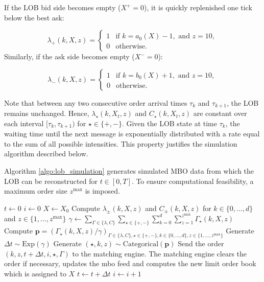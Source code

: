 \documentclass[10pt,a4paper,oneside]{article}
\begin{document}
If the LOB bid side becomes empty ($X^+ = 0$), it is quickly replenished one tick below the best ask:

\[
    \lambda_+(k, X, z) =
    \begin{cases}
        1 & \text{if } k = a_0(X) - 1, \text{ and } z = 10, \\
        0 & \text{otherwise.}
    \end{cases}
\]
Similarly, if the ask side becomes empty ($X^- = 0$):

\[
    \lambda_-(k, X, z) =
    \begin{cases}
        1 & \text{if } k = b_0(X) + 1, \text{ and } z = 10, \\
        0 & \text{otherwise.}
    \end{cases}
\]

Note that between any two consecutive order arrival times $\tau_k$ and $\tau_{k+1}$, the LOB remains unchanged. Hence, $\lambda_{\star}(k, X_t, z)$ and $C_{\star}(k, X_t, z)$ are constant over each interval $[\tau_k, \tau_{k+1})$ for $\star \in \{+, -\}$. Given the LOB state at time $\tau_k$, the waiting time until the next message is exponentially distributed with a rate equal to the sum of all possible intensities. This property justifies the simulation algorithm described below.

Algorithm \ref{algo:lob_simulation} generates simulated MBO data from which the LOB can be reconstructed for $t \in [0,T]$. To ensure computational feasibility, a maximum order size $z^{\max}$ is imposed.


\begin{algorithm}[H]
    \caption{Limit Order Book Simulation Algorithm}
    \label{algo:lob_simulation}
    \begin{algorithmic}
        \State $t \gets 0$
        \State $i \gets 0$
        \State $X \gets X_0$
        \State Compute $\lambda_{\pm}(k, X, z)$ and $C_{\pm}(k, X, z)$ for $k \in \{0 , \dots, d \}$ and $z \in \{ 1, \dots, z^{\max} \}$
        \State $\gamma \gets \sum_{\Gamma \in \{ \lambda, C \}} \sum_{\star \in \{+, - \}} \sum^{d}_{k = 0} \sum^{z^{\max}}_{z = 1} \Gamma_{\star}(k, X, z)$
        \State Compute $\mathbf{p} = \left(\Gamma_{\star}(k, X, z) / \gamma\right)_{\Gamma \in \{ \lambda, C \}, \star \in \{+, -\}, k \in \{ 0, \dots, d \}, z \in \{1, \dots, z^{\max} \} }$
        \State Generate $\Delta t \sim \text{Exp}(\gamma)$
        \State Generate $(\star, k, z) \sim \text{Categorical}(\mathbf{p})$
        \State Send the order $(k, z, t + \Delta t, i, \star, \Gamma)$ to the matching engine.
        \State The matching engine clears the order if necessary, updates the mbo feed and computes the new limit order book which is assigned to $X$
        \State $t \gets t + \Delta t$
        \State $i \gets i + 1$
        \EndWhile
    \end{algorithmic}
\end{algorithm}
\end{document}
